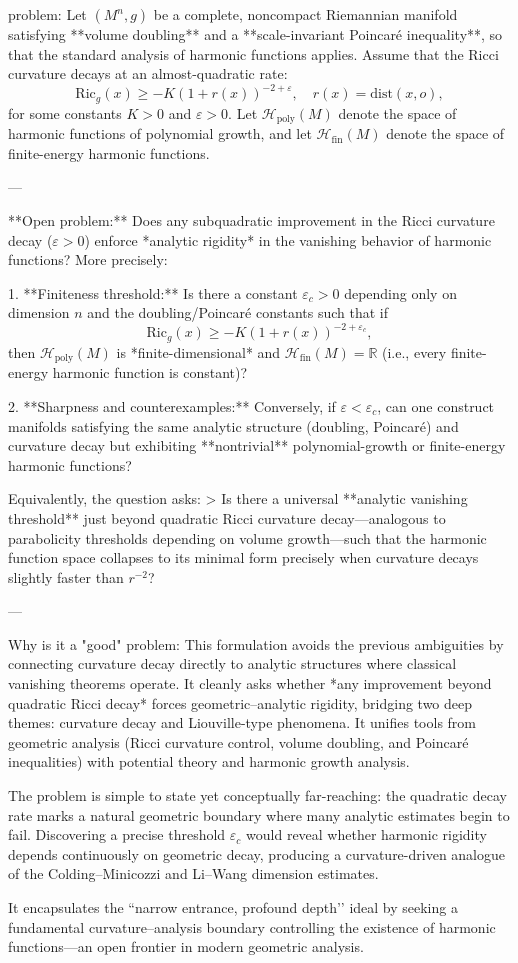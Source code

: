 problem:  
Let \((M^n,g)\) be a complete, noncompact Riemannian manifold satisfying **volume doubling** and a **scale-invariant Poincaré inequality**, so that the standard analysis of harmonic functions applies.  
Assume that the Ricci curvature decays at an almost-quadratic rate:
\[
\mathrm{Ric}_g(x) \ge -K(1+r(x))^{-2+\varepsilon}, \quad r(x)=\mathrm{dist}(x,o),
\]
for some constants \(K>0\) and \(\varepsilon>0\).  
Let \(\mathcal{H}_{\mathrm{poly}}(M)\) denote the space of harmonic functions of polynomial growth, and let \(\mathcal{H}_{\mathrm{fin}}(M)\) denote the space of finite-energy harmonic functions.

---

**Open problem:**  
Does any subquadratic improvement in the Ricci curvature decay (\(\varepsilon>0\)) enforce *analytic rigidity* in the vanishing behavior of harmonic functions? More precisely:

1. **Finiteness threshold:**  
   Is there a constant \(\varepsilon_c>0\) depending only on dimension \(n\) and the doubling/Poincaré constants such that if  
   \[
   \mathrm{Ric}_g(x) \ge -K(1+r(x))^{-2+\varepsilon_c},
   \]
   then
   \(\mathcal{H}_{\mathrm{poly}}(M)\) is *finite-dimensional* and  
   \(\mathcal{H}_{\mathrm{fin}}(M)=\mathbb{R}\) (i.e., every finite-energy harmonic function is constant)?

2. **Sharpness and counterexamples:**  
   Conversely, if \(\varepsilon<\varepsilon_c\), can one construct manifolds satisfying the same analytic structure (doubling, Poincaré) and curvature decay but exhibiting **nontrivial** polynomial-growth or finite-energy harmonic functions?

Equivalently, the question asks:  
> Is there a universal **analytic vanishing threshold** just beyond quadratic Ricci curvature decay—analogous to parabolicity thresholds depending on volume growth—such that the harmonic function space collapses to its minimal form precisely when curvature decays slightly faster than \(r^{-2}\)?

---

Why is it a "good" problem:  
This formulation avoids the previous ambiguities by connecting curvature decay directly to analytic structures where classical vanishing theorems operate. It cleanly asks whether *any improvement beyond quadratic Ricci decay* forces geometric–analytic rigidity, bridging two deep themes: curvature decay and Liouville-type phenomena.  
It unifies tools from geometric analysis (Ricci curvature control, volume doubling, and Poincaré inequalities) with potential theory and harmonic growth analysis.  

The problem is simple to state yet conceptually far-reaching: the quadratic decay rate marks a natural geometric boundary where many analytic estimates begin to fail. Discovering a precise threshold \(\varepsilon_c\) would reveal whether harmonic rigidity depends continuously on geometric decay, producing a curvature-driven analogue of the Colding–Minicozzi and Li–Wang dimension estimates.  

It encapsulates the “narrow entrance, profound depth’’ ideal by seeking a fundamental curvature–analysis boundary controlling the existence of harmonic functions—an open frontier in modern geometric analysis.